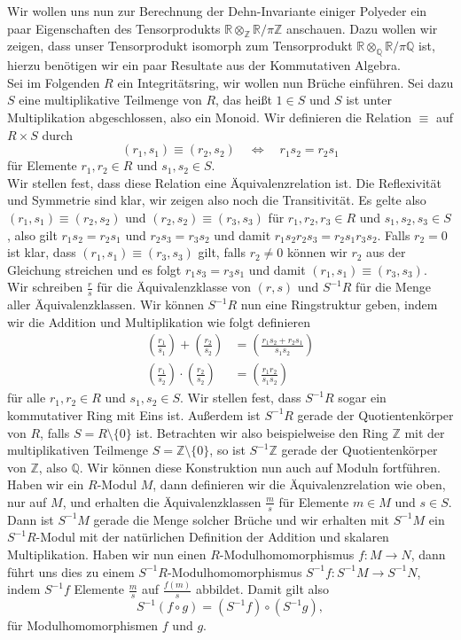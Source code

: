 \documentclass[11pt,titlepage]{article}
\newcommand{\setZ}{\mathbb{Z}}
\newcommand{\setQ}{\mathbb{Q}}
\newcommand{\setR}{\mathbb{R}}
\theoremstyle{definition}
\theoremstyle{remark}
\begin{document}
	Wir wollen uns nun zur Berechnung der Dehn-Invariante einiger Polyeder ein paar Eigenschaften des Tensorprodukts $\setR\otimes_{\setZ}\setR /\pi\setZ$ anschauen. Dazu wollen wir zeigen, dass unser Tensorprodukt isomorph zum Tensorprodukt  
	$\setR\otimes_{\setQ}\setR /\pi\setQ$ ist, hierzu benötigen wir ein 
	paar Resultate 
	aus der Kommutativen Algebra. \\
	Sei im Folgenden $R$ ein Integritätsring, wir wollen nun 
	Brüche einführen. Sei dazu $S$ eine multiplikative Teilmenge von $R$, das heißt  
	$1\in S$ und $S$ ist unter Multiplikation abgeschlossen, also ein Monoid. Wir 
	definieren die Relation $\equiv$ auf $R\times S$ durch
	\[(r_1,s_1)\equiv(r_2,s_2)\quad \Leftrightarrow\quad r_1 s_2 =r_2 s_1\]
	für Elemente $r_1,r_2\in R$ und $s_1,s_2\in S$. \\
	Wir stellen fest, dass diese Relation  eine Äquivalenzrelation ist. Die 
	Reflexivität und Symmetrie sind klar, wir zeigen also noch die Transitivität.
	Es gelte also $(r_1,s_1)\equiv(r_2,s_2)$ und $(r_2,s_2)\equiv(r_3,s_3)$ für 
	$r_1,r_2,r_3\in R$ und $s_1,s_2,s_3\in S$, also gilt $r_1 s_2= r_2 s_1$ und 
	$r_2 s_3 =r_3 s_2$ und damit $r_1 s_2 r_2 s_3 =r_2 s_1 r_3 s_2$. Falls $r_2=0$ 
	ist klar, dass $(r_1,s_1)\equiv(r_3,s_3)$ gilt, falls $r_2\neq 0$ können wir $r_2$ aus der Gleichung streichen und es folgt 
	$r_1 s_3=r_3 s_1$ und damit $(r_1,s_1)\equiv(r_3,s_3)$. \\
	Wir schreiben $\frac{r}{s}$ für die Äquivalenzklasse von $(r,s)$ und $S^{-1}R$ 
	für die Menge aller Äquivalenzklassen. Wir können $S^{-1}R$ nun eine Ringstruktur geben, indem wir die Addition und Multiplikation wie folgt definieren
	\begin{align*}
		\left(\frac{r_1}{s_1}\right)+\left(\frac{r_2}{s_2}\right)
		&=\left(\frac{r_1s_2+r_2s_1}{s_1s_2}\right) \\
		\left(\frac{r_1}{s_2}\right)\cdot\left(\frac{r_2}{s_2}\right)
		&=\left(\frac{r_1r_2}{s_1s_2}\right)
	\end{align*}
	für alle $r_1,r_2\in R$ und $s_1,s_2\in S$. Wir stellen fest, dass 
	$S^{-1}R$ sogar ein kommutativer Ring mit Eins ist. Außerdem ist 
	$S^{-1}R$ gerade der Quotientenkörper von $R$, falls $S=R\setminus\{0\}$ ist. Betrachten wir also beispielweise den Ring 
	$\setZ$ mit der multiplikativen Teilmenge $S=\setZ\setminus\{0\}$, so 
	ist $S^{-1}\setZ$ gerade der Quotientenkörper von $\setZ$, also 
	$\setQ$. Wir können diese Konstruktion nun auch auf Moduln fortführen. 
	Haben wir ein $R$-Modul $M$, dann definieren wir 
	die Äquivalenzrelation wie oben, nur auf $M$, und erhalten die 
	Äquivalenzklassen $\frac{m}{s}$ für Elemente $m\in M$ und $s\in S$. 
	Dann ist $S^{-1}M$ gerade die Menge solcher Brüche und wir erhalten 
	mit $S^{-1}M$ ein $S^{-1}R$-Modul mit der natürlichen Definition 
	der Addition und skalaren Multiplikation. Haben wir nun einen 
	$R$-Modulhomomorphismus $f:M\to N$, dann führt uns dies zu einem 
	$S^{-1}R$-Modulhomomorphismus $S^{-1}f:S^{-1}M\to S^{-1}N$, indem $S^{-1}f$ 
	Elemente $\frac{m}{s}$ auf $\frac{f(m)}{s}$ abbildet. Damit gilt also 
	\[S^{-1}(f\circ g)=(S^{-1}f)\circ(S^{-1}g),\]
	für Modulhomomorphismen $f$ und $g$.
	
\end{document}

